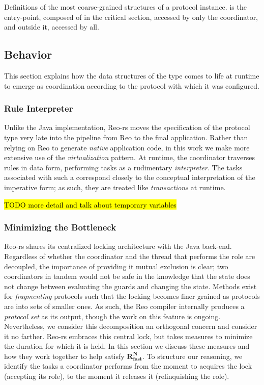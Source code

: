 \begin{listing}[ht]
	\centering
	\inputminted{rust}{proto.rs}
	\caption[Proto type with parts inside and outside the lock.]{Definitions of the most coarse-grained structures of a protocol instance.  is the entry-point, composed of  in the critical section, accessed by only the coordinator, and  outside it, accessed by all.}
	\label{listing:proto}
\end{listing}


\subsection{Behavior}
\label{sec:behavior_implementation}
This section explains how the data structures of the  type comes to life at runtime to emerge as coordination according to the protocol with which it was configured. 

\subsubsection{Rule Interpreter}
Unlike the Java implementation, Reo-rs moves the specification of the protocol type very late into the pipeline from Reo to the final application. Rather than relying on Reo to generate \textit{native} application code, in this work we make more extensive use of the \textit{virtualization} pattern. At runtime, the coordinator traverses rules in data form, performing tasks as a rudimentary \textit{interpreter}. The tasks associated with such a  correspond closely to the conceptual interpretation of the imperative form; as such, they are treated like \textit{transactions} at runtime. 

\hl{TODO more detail and talk about temporary variables}


\subsubsection{Minimizing the Bottleneck}
\label{sec:minimizing_the_bottleneck}
Reo-rs shares its centralized locking architecture with the Java back-end. Regardless of whether the coordinator and the thread that performs the role are decoupled, the importance of providing it mutual exclusion is clear; two coordinators in tandem would not be safe in the knowledge that the state does not change between evaluating the guards and changing the state. Methods exist for \textit{fragmenting} protocols such that the locking becomes finer grained as protocols are into sets of smaller ones. As such, the Reo compiler internally produces a \textit{protocol set} as its output, though the work on this feature is ongoing. Nevertheless, we consider this decomposition an orthogonal concern and consider it no farther. Reo-rs embraces this central lock, but takes measures to minimize the duration for which it is held. In this section we discuss these measures and how they work together to help satisfy $\boldsymbol{R^N_{fast}}$. To structure our reasoning, we identify the tasks a coordinator performs from the moment to acquires the lock (accepting its role), to the moment it releases it (relinquishing the role). 

